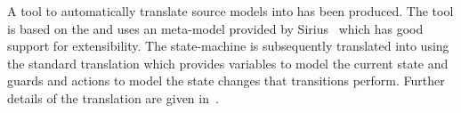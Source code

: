 



A tool to automatically translate \SCXML source models into \UMLB has been produced. 
The tool is based on the \EMF and uses an \SCXML meta-model provided by Sirius~\cite{siriuswebsite} which has good support for extensibility. 
The \UMLB state-machine is subsequently translated into \EVENTB using the standard \UMLB translation which provides variables to model the current state and guards and actions to model the state changes that transitions perform.
 Further details of the translation are given in~\cite{MoSnHo18,MoSnHo-ABZ2020}.

